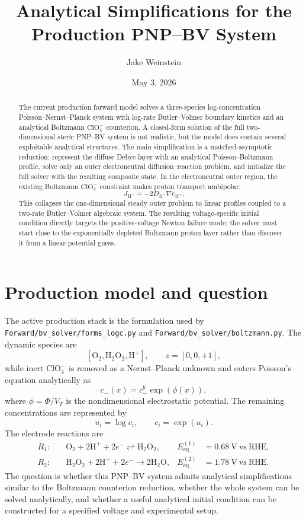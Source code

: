 \documentclass[11pt]{article}
\title{Analytical Simplifications for the Production PNP--BV System}
\author{Jake Weinstein}
\date{May 3, 2026}
\newcommand{\OO}{\mathrm{O}_2}
\newcommand{\PP}{\mathrm{H}_2\mathrm{O}_2}
\newcommand{\HH}{\mathrm{H}^{+}}
\newcommand{\ClO}{\mathrm{ClO}_4^{-}}
\newcommand{\VT}{V_T}
\newcommand{\Eeq}{E_{\mathrm{eq}}}
\begin{document}
\maketitle

\begin{abstract}
The current production forward model solves a three-species log-concentration
Poisson--Nernst--Planck system with log-rate Butler--Volmer boundary kinetics
and an analytical Boltzmann \(\ClO\) counterion. A closed-form solution of the
full two-dimensional steric PNP--BV system is not realistic, but the model
does contain several exploitable analytical structures. The main simplification
is a matched-asymptotic reduction: represent the diffuse Debye layer with an
analytical Poisson--Boltzmann profile, solve only an outer electroneutral
diffusion--reaction problem, and initialize the full solver with the resulting
composite state. In the electroneutral outer region, the existing Boltzmann
\(\ClO\) constraint makes proton transport ambipolar:
\[
  J_{\HH} = -2D_{\HH}\nabla c_{\HH}.
\]
This collapses the one-dimensional steady outer problem to linear profiles
coupled to a two-rate Butler--Volmer algebraic system. The resulting
voltage-specific initial condition directly targets the positive-voltage
Newton failure mode: the solver must start close to the exponentially depleted
Boltzmann proton layer rather than discover it from a linear-potential guess.
\end{abstract}

\section{Production model and question}

The active production stack is the formulation used by
\texttt{Forward/bv\_solver/forms\_logc.py} and
\texttt{Forward/bv\_solver/boltzmann.py}. The dynamic species are
\[
  [\OO,\PP,\HH],
  \qquad
  z = [0,0,+1],
\]
while inert \(\ClO\) is removed as a Nernst--Planck unknown and enters
Poisson's equation analytically as
\begin{equation}
  c_-(x) = c_-^b \exp(\phi(x)),
  \label{eq:clo-boltzmann}
\end{equation}
where \(\phi=\Phi/\VT\) is the nondimensional electrostatic potential.
The remaining concentrations are represented by
\[
  u_i = \log c_i,
  \qquad
  c_i = \exp(u_i).
\]
The electrode reactions are
\begin{align}
  R_1:\quad & \OO + 2\HH + 2e^- \rightleftharpoons \PP,
  &
  \Eeq^{(1)} &= 0.68~\mathrm{V~vs~RHE}, \\
  R_2:\quad & \PP + 2\HH + 2e^- \rightarrow 2\mathrm{H}_2\mathrm{O},
  &
  \Eeq^{(2)} &= 1.78~\mathrm{V~vs~RHE}.
\end{align}
The question is whether this PNP--BV system admits analytical simplifications
similar to the Boltzmann counterion reduction, whether the whole system can be
solved analytically, and whether a useful analytical initial condition can be
constructed for a specified voltage and experimental setup.
\end{document}
